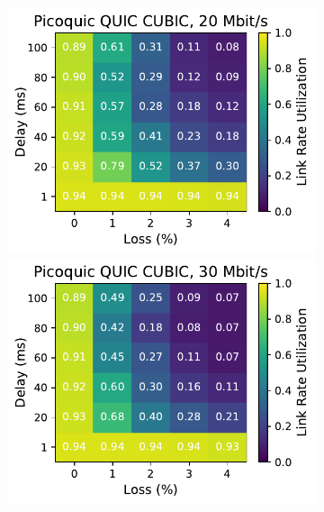 \begin{figure}[ht]
\begin{subfigure}[b]{0.22\linewidth}
        \includegraphics[width=\linewidth,trim={0 0 2cm 0},clip]{splitting-paper/figures/heatmaps/heatmap_picoquic_cubic_20mbps.pdf}
        \includegraphics[width=\linewidth,trim={0 0 2cm 0},clip]{splitting-paper/figures/heatmaps/heatmap_picoquic_cubic_30mbps.pdf}

\end{subfigure}
\end{figure}
